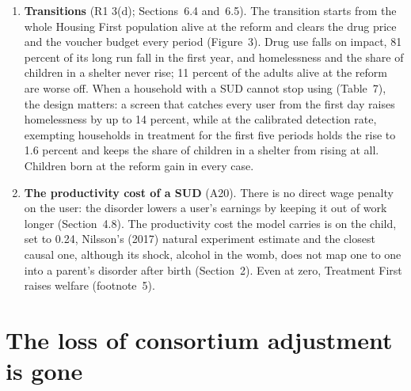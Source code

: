 \documentclass[11pt]{article}
\begin{document}
{\begin{enumerate}
\item \textbf{Transitions} (R1 3(d); Sections~6.4 and~6.5). The transition starts from the whole
Housing First population alive at the reform and clears the drug price and the voucher budget
every period (Figure~3). Drug use falls on impact, 81 percent of its long run fall in the first
year, and homelessness and the share of children in a shelter never rise; 11 percent of the
adults alive at the reform are worse off. When a household with a SUD cannot stop using
(Table~7), the design matters: a screen that catches every user from the first day raises
homelessness by up to 14 percent, while at the calibrated detection rate, exempting households
in treatment for the first five periods holds the rise to 1.6 percent and keeps the share of
children in a shelter from rising at all. Children born at the reform gain in every case.

\item \textbf{The productivity cost of a SUD} (A20). \open There is no direct wage penalty on
the user: the disorder lowers a user's earnings by keeping it out of work longer
(Section~4.8). The productivity cost the model carries is on the child, set to 0.24, Nilsson's
(2017) natural experiment estimate and the closest causal one, although its shock, alcohol in
the womb, does not map one to one into a parent's disorder after birth (Section~2). Even at
zero, Treatment First raises welfare (footnote~5).
\end{enumerate}
}

\section*{\color{respred}The loss of consortium adjustment is gone}
\end{document}

